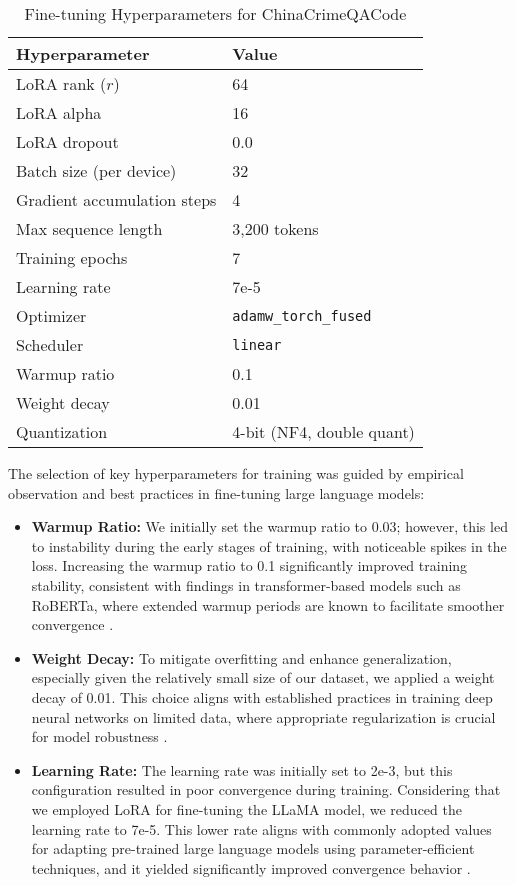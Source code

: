 \begin{table}[H]
\centering
\caption{Fine-tuning Hyperparameters for ChinaCrimeQACode}
\label{tab:hyperparameters}
\begin{tabular}{ll}
\toprule
\textbf{Hyperparameter} & \textbf{Value} \\
\midrule
LoRA rank ($r$) & 64 \\
LoRA alpha & 16 \\
LoRA dropout & 0.0 \\
Batch size (per device) & 32 \\
Gradient accumulation steps & 4 \\
Max sequence length & 3,200 tokens \\
Training epochs & 7 \\
Learning rate & 7e-5 \\
Optimizer & \texttt{adamw\_torch\_fused} \\
Scheduler & \texttt{linear} \\
Warmup ratio & 0.1 \\
Weight decay & 0.01 \\
Quantization & 4-bit (NF4, double quant) \\
\bottomrule
\end{tabular}
\end{table}

The selection of key hyperparameters for training was guided by empirical observation and best practices in fine-tuning large language models:
\begin{itemize}
    
\item \textbf{Warmup Ratio:} We initially set the warmup ratio to 0.03; however, this led to instability during the early stages of training, with noticeable spikes in the loss. Increasing the warmup ratio to 0.1 significantly improved training stability, consistent with findings in transformer-based models such as RoBERTa, where extended warmup periods are known to facilitate smoother convergence \cite{liu2019robertarobustlyoptimizedbert}.

\item \textbf{Weight Decay:} To mitigate overfitting and enhance generalization, especially given the relatively small size of our dataset, we applied a weight decay of 0.01. This choice aligns with established practices in training deep neural networks on limited data, where appropriate regularization is crucial for model robustness \cite{brainacgan}.

\item \textbf{Learning Rate:} The learning rate was initially set to 2e-3, but this configuration resulted in poor convergence during training. Considering that we employed LoRA for fine-tuning the LLaMA model, we reduced the learning rate to 7e-5. This lower rate aligns with commonly adopted values for adapting pre-trained large language models using parameter-efficient techniques, and it yielded significantly improved convergence behavior \cite{zhou2024automixqselfadjustingquantizationhigh}.

\end{itemize}

